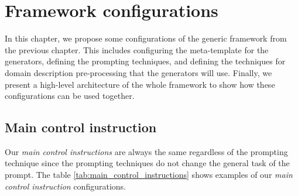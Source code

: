 \chapter{Framework configurations}
\label{chap:framework_configuration}

In this chapter, we propose some configurations of the generic framework from the previous chapter. This includes configuring the meta-template for the generators, defining the prompting techniques, and defining the techniques for domain description pre-processing that the generators will use. Finally, we present a high-level architecture of the whole framework to show how these configurations can be used together.


\section{Main control instruction}

Our \emph{main control instructions} are always the same regardless of the prompting technique since the prompting techniques do not change the general task of the prompt. The table \ref{tab:main_control_instructions} shows examples of our \emph{main control instruction} configurations.


